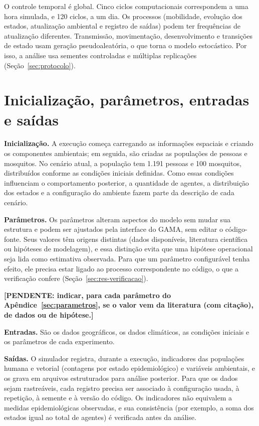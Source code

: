 O controle temporal é global. Cinco ciclos computacionais correspondem a uma hora simulada, e 120 ciclos, a um dia. Os processos (mobilidade, evolução dos estados, atualização ambiental e registro de saídas) podem ter frequências de atualização diferentes. Transmissão, movimentação, desenvolvimento e transições de estado usam geração pseudoaleatória, o que torna o modelo estocástico. Por isso, a análise usa sementes controladas e múltiplas replicações (Seção~\ref{sec:protocolo}).

\section{Inicialização, parâmetros, entradas e saídas}

\textbf{Inicialização.} A execução começa carregando as informações espaciais e criando os componentes ambientais; em seguida, são criadas as populações de pessoas e mosquitos. No cenário atual, a população tem 1.191 pessoas e 100 mosquitos, distribuídos conforme as condições iniciais definidas. Como essas condições influenciam o comportamento posterior, a quantidade de agentes, a distribuição dos estados e a configuração do ambiente fazem parte da descrição de cada cenário.

\textbf{Parâmetros.} Os parâmetros alteram aspectos do modelo sem mudar sua estrutura e podem ser ajustados pela interface do GAMA, sem editar o código-fonte. Seus valores têm origens distintas (dados disponíveis, literatura científica ou hipóteses de modelagem), e essa distinção evita que uma hipótese operacional seja lida como estimativa observada. Para que um parâmetro configurável tenha efeito, ele precisa estar ligado ao processo correspondente no código, o que a verificação confere (Seção~\ref{sec:res-verificacao}).

\textbf{[PENDENTE: indicar, para cada parâmetro do Apêndice~\ref{sec:parametros}, se o valor vem da literatura (com citação), de dados ou de hipótese.]}

\textbf{Entradas.} São os dados geográficos, os dados climáticos, as condições iniciais e os parâmetros de cada experimento.

\textbf{Saídas.} O simulador registra, durante a execução, indicadores das populações humana e vetorial (contagens por estado epidemiológico) e variáveis ambientais, e os grava em arquivos estruturados para análise posterior. Para que os dados sejam rastreáveis, cada registro precisa ser associado à configuração usada, à repetição, à semente e à versão do código. Os indicadores não equivalem a medidas epidemiológicas observadas, e sua consistência (por exemplo, a soma dos estados igual ao total de agentes) é verificada antes da análise.

